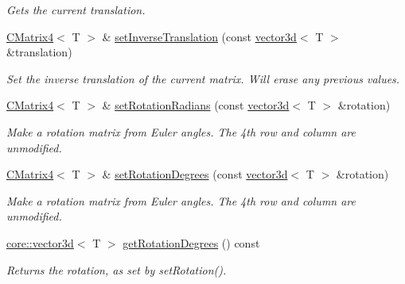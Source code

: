 \begin{DoxyCompactItemize}
\begin{DoxyCompactList}\small\item\em Gets the current translation. \end{DoxyCompactList}\item 
\mbox{\label{classirr_1_1core_1_1CMatrix4_a258e103fcb6ce1564978624280ecb7fe}} 
\hyperlink{classirr_1_1core_1_1CMatrix4}{C\+Matrix4}$<$ T $>$ \& \hyperlink{classirr_1_1core_1_1CMatrix4_a258e103fcb6ce1564978624280ecb7fe}{set\+Inverse\+Translation} (const \hyperlink{classirr_1_1core_1_1vector3d}{vector3d}$<$ T $>$ \&translation)
\begin{DoxyCompactList}\small\item\em Set the inverse translation of the current matrix. Will erase any previous values. \end{DoxyCompactList}\item 
\mbox{\label{classirr_1_1core_1_1CMatrix4_a05aac7bd2e7651369fc813a51258afbe}} 
\hyperlink{classirr_1_1core_1_1CMatrix4}{C\+Matrix4}$<$ T $>$ \& \hyperlink{classirr_1_1core_1_1CMatrix4_a05aac7bd2e7651369fc813a51258afbe}{set\+Rotation\+Radians} (const \hyperlink{classirr_1_1core_1_1vector3d}{vector3d}$<$ T $>$ \&rotation)
\begin{DoxyCompactList}\small\item\em Make a rotation matrix from Euler angles. The 4th row and column are unmodified. \end{DoxyCompactList}\item 
\mbox{\label{classirr_1_1core_1_1CMatrix4_a8ee5ef8619d4b0f56d72ac84495ed644}} 
\hyperlink{classirr_1_1core_1_1CMatrix4}{C\+Matrix4}$<$ T $>$ \& \hyperlink{classirr_1_1core_1_1CMatrix4_a8ee5ef8619d4b0f56d72ac84495ed644}{set\+Rotation\+Degrees} (const \hyperlink{classirr_1_1core_1_1vector3d}{vector3d}$<$ T $>$ \&rotation)
\begin{DoxyCompactList}\small\item\em Make a rotation matrix from Euler angles. The 4th row and column are unmodified. \end{DoxyCompactList}\item 
\hyperlink{classirr_1_1core_1_1vector3d}{core\+::vector3d}$<$ T $>$ \hyperlink{classirr_1_1core_1_1CMatrix4_ad334281fcd12eb5acda020981706b759}{get\+Rotation\+Degrees} () const
\begin{DoxyCompactList}\small\item\em Returns the rotation, as set by set\+Rotation(). \end{DoxyCompactList}\item 

\end{DoxyCompactItemize}
